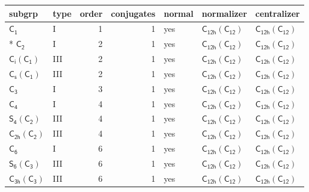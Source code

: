 \documentclass[10pt,a4paper]{article}
\numberwithin{equation}{section}
\newcommand{\grp}[1]{\mathsf{#1}}
\begin{document}
{\small\begin{longtable}{@{}llrrlll@{}}\toprule
subgrp & type & order & conjugates & normal & normalizer & centralizer\\\midrule\endhead
\bottomrule\endfoot\endlastfoot
\href{../../../rotation/data/pdf/C1.pdf}{$\grp{C_{1}}$} & I & 1 & 1 & yes & \href{C12h-C12.pdf}{$\grp{C_{12h}}(\grp{C_{12}})$} & \href{C12h-C12.pdf}{$\grp{C_{12h}}(\grp{C_{12}})$}\\*
\href{../../../rotation/data/pdf/C2.pdf}{$\grp{C_{2}}$} & I & 2 & 1 & yes & \href{C12h-C12.pdf}{$\grp{C_{12h}}(\grp{C_{12}})$} & \href{C12h-C12.pdf}{$\grp{C_{12h}}(\grp{C_{12}})$}\\
\href{S2-C1.pdf}{$\grp{C_{i}}(\grp{C_{1}})$} & III & 2 & 1 & yes & \href{C12h-C12.pdf}{$\grp{C_{12h}}(\grp{C_{12}})$} & \href{C12h-C12.pdf}{$\grp{C_{12h}}(\grp{C_{12}})$}\\
\href{C1v-C1.pdf}{$\grp{C_{s}}(\grp{C_{1}})$} & III & 2 & 1 & yes & \href{C12h-C12.pdf}{$\grp{C_{12h}}(\grp{C_{12}})$} & \href{C12h-C12.pdf}{$\grp{C_{12h}}(\grp{C_{12}})$}\\
\href{../../../rotation/data/pdf/C3.pdf}{$\grp{C_{3}}$} & I & 3 & 1 & yes & \href{C12h-C12.pdf}{$\grp{C_{12h}}(\grp{C_{12}})$} & \href{C12h-C12.pdf}{$\grp{C_{12h}}(\grp{C_{12}})$}\\
\href{../../../rotation/data/pdf/C4.pdf}{$\grp{C_{4}}$} & I & 4 & 1 & yes & \href{C12h-C12.pdf}{$\grp{C_{12h}}(\grp{C_{12}})$} & \href{C12h-C12.pdf}{$\grp{C_{12h}}(\grp{C_{12}})$}\\
\href{S4-C2.pdf}{$\grp{S_{4}}(\grp{C_{2}})$} & III & 4 & 1 & yes & \href{C12h-C12.pdf}{$\grp{C_{12h}}(\grp{C_{12}})$} & \href{C12h-C12.pdf}{$\grp{C_{12h}}(\grp{C_{12}})$}\\
\href{C2h-C2.pdf}{$\grp{C_{2h}}(\grp{C_{2}})$} & III & 4 & 1 & yes & \href{C12h-C12.pdf}{$\grp{C_{12h}}(\grp{C_{12}})$} & \href{C12h-C12.pdf}{$\grp{C_{12h}}(\grp{C_{12}})$}\\
\href{../../../rotation/data/pdf/C6.pdf}{$\grp{C_{6}}$} & I & 6 & 1 & yes & \href{C12h-C12.pdf}{$\grp{C_{12h}}(\grp{C_{12}})$} & \href{C12h-C12.pdf}{$\grp{C_{12h}}(\grp{C_{12}})$}\\
\href{S6-C3.pdf}{$\grp{S_{6}}(\grp{C_{3}})$} & III & 6 & 1 & yes & \href{C12h-C12.pdf}{$\grp{C_{12h}}(\grp{C_{12}})$} & \href{C12h-C12.pdf}{$\grp{C_{12h}}(\grp{C_{12}})$}\\
\href{C3h-C3.pdf}{$\grp{C_{3h}}(\grp{C_{3}})$} & III & 6 & 1 & yes & \href{C12h-C12.pdf}{$\grp{C_{12h}}(\grp{C_{12}})$} & \href{C12h-C12.pdf}{$\grp{C_{12h}}(\grp{C_{12}})$}\\

\end{longtable}}
\end{document}
